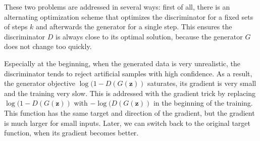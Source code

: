These two problems are addressed in several ways: first of all, there is an alternating optimization scheme that optimizes the discriminator for a fixed sets of steps $k$ and afterwards the generator for a single step. This ensures the discriminator $D$ is always close to its optimal solution, because the generator $G$ does not change too quickly. 

Especially at the beginning, when the generated data is very unrealistic, the discriminator tends to reject artificial samples with high confidence. As a result, the generator objective $\log(1 - D(G(\mathbf{z}))$ saturates, its gradient is very small and the training very slow. This is addressed with the gradient trick by replacing $\log(1 - D(G(\mathbf{z}))$ with $-\log(D(G(\mathbf{z}))$ in the beginning of the training. This function has the same target and direction of the gradient, but the gradient is much larger for small inputs. Later, we can switch back to the original target function, when its gradient becomes better.

\printbibliography

